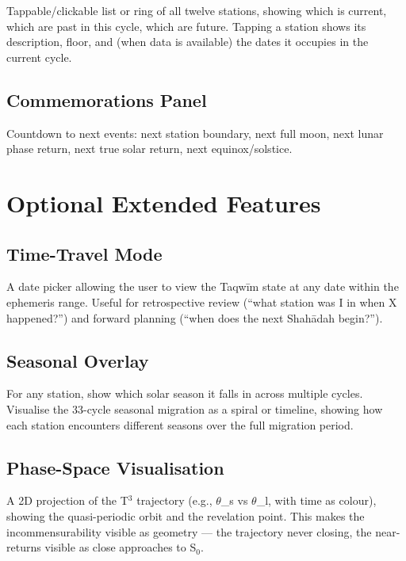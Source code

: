 Tappable/clickable list or ring of all twelve stations, showing which is current, which are past in this cycle, which are future. Tapping a station shows its description, floor, and (when data is available) the dates it occupies in the current cycle.

\hypertarget{commemorations-panel}{%
\subsection{Commemorations Panel}\label{commemorations-panel}}

Countdown to next events: next station boundary, next full moon, next lunar phase return, next true solar return, next equinox/solstice.

\hypertarget{optional-extended-features}{%
\section{Optional Extended Features}\label{optional-extended-features}}

\hypertarget{time-travel-mode}{%
\subsection{Time-Travel Mode}\label{time-travel-mode}}

A date picker allowing the user to view the Taqwīm state at any date within the ephemeris range. Useful for retrospective review (``what station was I in when X happened?'') and forward planning (``when does the next Shahādah begin?'').

\hypertarget{seasonal-overlay}{%
\subsection{Seasonal Overlay}\label{seasonal-overlay}}

For any station, show which solar season it falls in across multiple cycles. Visualise the 33-cycle seasonal migration as a spiral or timeline, showing how each station encounters different seasons over the full migration period.

\hypertarget{phase-space-visualisation}{%
\subsection{Phase-Space Visualisation}\label{phase-space-visualisation}}

A 2D projection of the T\(^3\) trajectory (e.g., \(\theta\)\_s vs \(\theta\)\_l, with time as colour), showing the quasi-periodic orbit and the revelation point. This makes the incommensurability visible as geometry --- the trajectory never closing, the near-returns visible as close approaches to S\(_0\).

